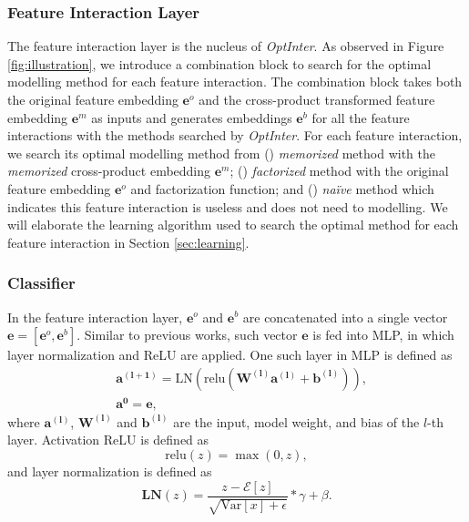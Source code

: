 \documentclass[conference]{IEEEtran}
\begin{document}
\subsubsection{Feature Interaction Layer}
\label{feature}
The feature interaction layer is the nucleus of \textit{OptInter}. As observed in Figure \ref{fig:illustration}, we introduce a combination block to search for the optimal modelling method for each feature interaction. The combination block takes both the original feature embedding $\mathbf{e}^{o}$ and the cross-product transformed feature embedding $\mathbf{e}^{m}$ as inputs and generates embeddings $\mathbf{e}^{b}$ for all the feature interactions with the methods searched by \textit{OptInter}. For each feature interaction, we search its optimal modelling method from () \emph{memorized} method with the \emph{memorized} cross-product embedding $\mathbf{e}^{m}$; () \emph{factorized} method with the original feature embedding $\mathbf{e}^{o}$ and factorization function; and () \emph{naïve} method which indicates this feature interaction is useless and does not need to modelling. We will elaborate the learning algorithm used to search the optimal method for each feature interaction in Section \ref{sec:learning}.

\subsubsection{Classifier}
\label{classifier}
In the feature interaction layer, $\mathbf{e}^{o}$ and $\mathbf{e}^{b}$ are concatenated into a single vector $\mathbf{e}=[\mathbf{e}^{o}, \mathbf{e}^{b}]$. Similar to previous works\cite{PNN16,DeepFM,PNN19}, such vector $\mathbf{e}$ is fed into MLP, in which layer normalization and ReLU are applied. One such layer in MLP is defined as
\begin{equation}
\begin{split}
    & \mathbf{a^{(l+1)}} = \text{LN}(\text{relu}(\mathbf{W^{(l)}}\mathbf{a^{(l)}} + \mathbf{b^{(l)}})), \\
    & \mathbf{a^0} = \mathbf{e},
\end{split}
\end{equation}
where $\mathbf{a^{(l)}}$, $\mathbf{W^{(l)}}$ and $\mathbf{b^{(l)}}$ are the input, model weight, and bias of the $l$-th layer. Activation ReLU is defined as
\begin{equation}
    \text{relu}(z)=\max(0,z),
\end{equation}
and layer normalization is defined as \cite{LayerNorm} 
\begin{equation}
    \textbf{LN}(z) = \frac{z - \mathcal{E}[z]}{\sqrt{\text{Var}[x]+\epsilon}} * \gamma + \beta.
\end{equation}
\end{document}
